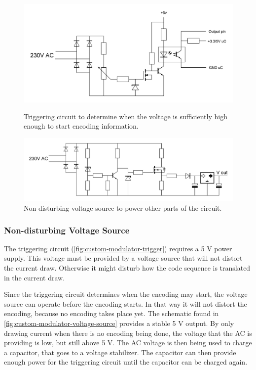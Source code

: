 	\begin{figure}[!tbp]
	  \centering
	  \begin{minipage}[b]{0.48\textwidth}
	    \includegraphics[width=\textwidth]{chapters/hardware-chapters/custom-modulator-trigger.JPG}
	    \caption{Triggering circuit to determine when the voltage is sufficiently high enough to start encoding information.}
		\label{fig:custom-modulator-trigger}
	  \end{minipage}
	  \hfill
	  \begin{minipage}[b]{0.48\textwidth}
	    \includegraphics[width=\textwidth]{chapters/hardware-chapters/custom-modulator-voltage-source.JPG}
	    \caption{Non-disturbing voltage source to power other parts of the circuit.}
		\label{fig:custom-modulator-voltage-source}
	  \end{minipage}
	\end{figure}


	\subsubsection{Non-disturbing Voltage Source}

	The triggering circuit (\autoref{fig:custom-modulator-trigger}) requires a 5 V power supply.
	This voltage must be provided by a voltage source that will not distort the current draw.
	Otherwise it might disturb how the code sequence is translated in the current draw.

	Since the triggering circuit determines when the encoding may start, the voltage source can operate before the encoding starts.
	In that way it will not distort the encoding, because no encoding takes place yet.
	The schematic found in \autoref{fig:custom-modulator-voltage-source} provides a stable 5 V output.
	By only drawing current when there is no encoding being done, the voltage that the AC is providing is low, but still above 5 V.
	The AC voltage is then being used to charge a capacitor, that goes to a voltage stabilizer.
	The capacitor can then provide enough power for the triggering circuit until the capacitor can be charged again.


